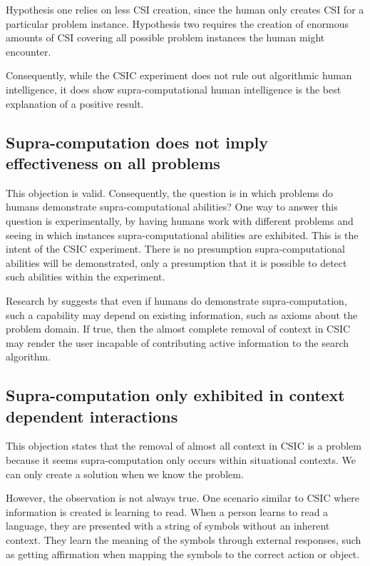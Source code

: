  Hypothesis one relies on less CSI creation, since the human only creates CSI for a particular problem instance.  Hypothesis two requires the creation of enormous amounts of CSI covering all possible problem instances the human might encounter.

 Consequently, while the CSIC experiment does not rule out algorithmic human intelligence, it does show supra-computational human intelligence is the best explanation of a positive result. 

\subsection{Supra-computation does not imply effectiveness on all problems}
 This objection is valid.  Consequently, the question is in which problems do humans demonstrate supra-computational abilities?  One way to answer this question is experimentally, by having humans work with different problems and seeing in which instances supra-computational abilities are exhibited.  This is the intent of the CSIC experiment.  There is no presumption supra-computational abilities will be demonstrated, only a presumption that it is possible to detect such abilities within the experiment. 

Research by \citet{bartlett11:_using_turin_oracl_in_cognit_model} suggests that even if humans do demonstrate supra-computation, such a capability may depend on existing information, such as axioms about the problem domain.  If true, then the almost complete removal of context in CSIC may render the user incapable of contributing active information to the search algorithm.

\subsection{Supra-computation only exhibited in context dependent interactions}

This objection states that the removal of almost all context in CSIC is a problem because it seems supra-computation only occurs within situational contexts.  We can only create a solution when we know the problem.

However, the observation is not always true.  One scenario similar to CSIC where information is created is learning to read.  When a person learns to read a language, they are presented with a string of symbols without an inherent context.  They learn the meaning of the symbols through external responses, such as getting affirmation when mapping the symbols to the correct action or object.

